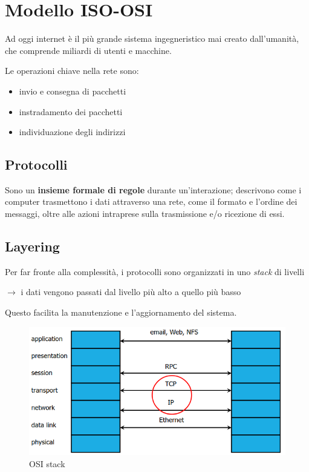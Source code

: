 \chapter{Modello ISO-OSI}
Ad oggi internet è il più grande sistema ingegneristico mai creato dall'umanità, che 
comprende miliardi di utenti e macchine.

\noindent Le operazioni chiave nella rete sono:
\begin{itemize}
    \item invio e consegna di pacchetti 
    \item instradamento dei pacchetti 
    \item individuazione degli indirizzi
\end{itemize}

\section{Protocolli}
Sono un \textbf{insieme formale di regole} durante un'interazione; descrivono come i computer trasmettono 
i dati attraverso una rete, come il formato e l'ordine dei messaggi, oltre alle azioni intraprese sulla 
trasmissione e/o ricezione di essi.

\section{Layering}
Per far fronte alla complessità, i protocolli sono organizzati in uno \textit{stack} di livelli

$\rightarrow$ i dati vengono passati dal livello più alto a quello più basso 

\noindent Questo facilita la manutenzione e l'aggiornamento del sistema.

\begin{figure}[H]
    \centering
    \includegraphics[width=1\linewidth]{chapters/7/images/osi-stack.png}
    \caption{OSI stack}
\end{figure}

